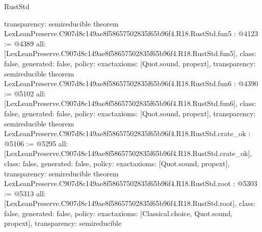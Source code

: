 \begin{lexlean}{RustStd}
\begin{coremodule}
{  transparency: semireducible
}
theorem LexLeanPreserve.C907d8c149ae8f58657502835f65b96f4.R18.RustStd.fun5 : @4123 := @4389 {
  all: [LexLeanPreserve.C907d8c149ae8f58657502835f65b96f4.R18.RustStd.fun5],
  class: false,
  generated: false,
  policy: exact{axioms: [Quot.sound, propext]},
  transparency: semireducible
}
theorem LexLeanPreserve.C907d8c149ae8f58657502835f65b96f4.R18.RustStd.fun6 : @4390 := @5102 {
  all: [LexLeanPreserve.C907d8c149ae8f58657502835f65b96f4.R18.RustStd.fun6],
  class: false,
  generated: false,
  policy: exact{axioms: [Quot.sound, propext]},
  transparency: semireducible
}
theorem LexLeanPreserve.C907d8c149ae8f58657502835f65b96f4.R18.RustStd.crate_ok : @5106 := @5295 {
  all: [LexLeanPreserve.C907d8c149ae8f58657502835f65b96f4.R18.RustStd.crate_ok],
  class: false,
  generated: false,
  policy: exact{axioms: [Quot.sound, propext]},
  transparency: semireducible
}
theorem LexLeanPreserve.C907d8c149ae8f58657502835f65b96f4.R18.RustStd.root : @5303 := @5313 {
  all: [LexLeanPreserve.C907d8c149ae8f58657502835f65b96f4.R18.RustStd.root],
  class: false,
  generated: false,
  policy: exact{axioms: [Classical.choice, Quot.sound, propext]},
  transparency: semireducible
}


\end{coremodule}
\end{lexlean}
